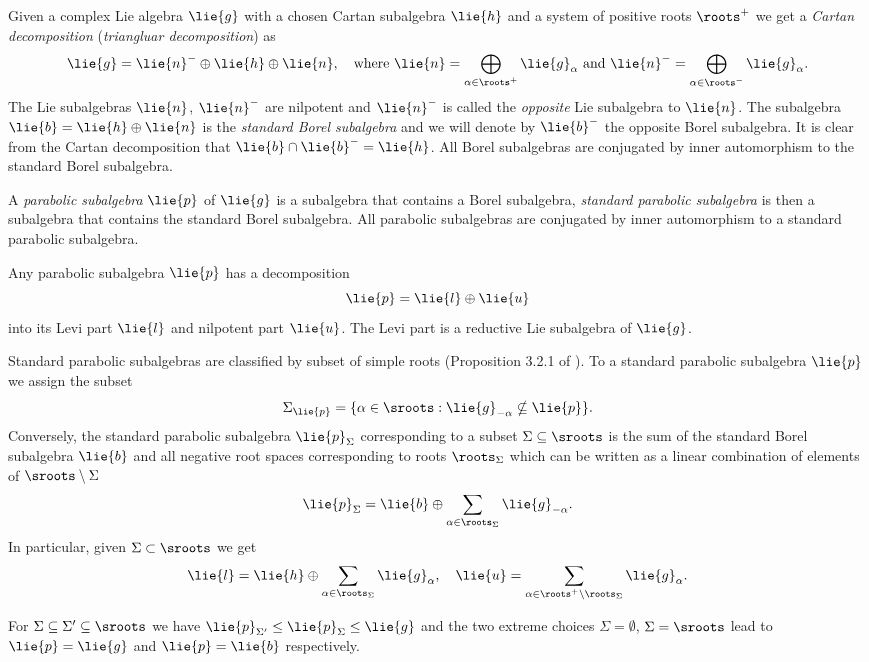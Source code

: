 Given a complex Lie algebra $\lie{g}$ with a chosen Cartan subalgebra $\lie{h}$ and a system of positive roots $\roots^+$ we get a \emph{Cartan decomposition} (\emph{triangluar decomposition}) as
\[
 \lie{g} = \lie{n}^- \oplus \lie{h} \oplus \lie{n}, \quad \text{where } \lie{n} = \bigoplus_{\alpha \in \roots^+} \lie{g}_\alpha \text{ and } \lie{n}^- = \bigoplus_{\alpha \in \roots^-} \lie{g}_\alpha.
\]
The Lie subalgebras $\lie{n}$, $\lie{n}^-$ are nilpotent and $\lie{n}^-$ is called the \emph{opposite} Lie subalgebra to $\lie{n}$. The subalgebra $\lie{b} = \lie{h}\oplus \lie{n}$ is the \emph{standard Borel subalgebra} and we will denote by $\lie{b}^-$ the opposite  Borel subalgebra. It is clear from the Cartan decomposition that $\lie{b}\cap\lie{b}^- = \lie{h}$. All Borel subalgebras are conjugated by inner automorphism to the standard Borel subalgebra.

A \emph{parabolic subalgebra} $\lie{p}$ of $\lie{g}$ is a subalgebra that contains a Borel subalgebra, \emph{standard parabolic subalgebra} is then a subalgebra that contains the standard Borel subalgebra. All parabolic subalgebras are conjugated by inner automorphism to a standard parabolic subalgebra.

Any parabolic subalgebra $\lie{p}$ has a decomposition
\[
 \lie{p} = \lie{l} \oplus \lie{u}
\]
into its Levi part $\lie{l}$ and nilpotent part $\lie{u}$. The Levi part is a reductive Lie subalgebra of $\lie{g}$.

Standard parabolic subalgebras are classified by subset of simple roots (Proposition 3.2.1 of \cite{cap_parabolic_2009}). To a standard parabolic subalgebra $\lie{p}$ we assign the subset \[\Sigma_\lie{p} = \{ \alpha\in\sroots : \lie{g}_{-\alpha}\nsubseteq \lie{p} \}.\] Conversely, the standard parabolic subalgebra $\lie{p}_\Sigma$ corresponding to a subset $\Sigma \subseteq \sroots$ is the sum of the standard Borel subalgebra $\lie{b}$ and all negative root spaces corresponding to roots $\roots_\Sigma$ which can be written as a linear combination of elements of $\sroots \setminus \Sigma$
\[
 \lie{p}_\Sigma = \lie{b} \oplus \sum_{\alpha \in \roots_\Sigma} \lie{g}_{-\alpha}.
\]
In particular, given $\Sigma \subset \sroots$ we get
\[
 \lie{l} = \lie{h} \oplus \sum_{\alpha \in \roots_\Sigma} \lie{g}_\alpha, \quad \lie{u} = \sum_{\alpha \in \roots^+ \setminus \roots_\Sigma} \lie{g}_{\alpha}.
\]

For $\Sigma \subseteq \Sigma' \subseteq \sroots$ we have $\lie{p}_{\Sigma'} \leq \lie{p}_\Sigma \leq \lie{g}$ and the two extreme choices $\Sigma = \emptyset$, $\Sigma = \sroots$ lead to $\lie{p}= \lie{g}$ and $\lie{p} = \lie{b}$ respectively.


